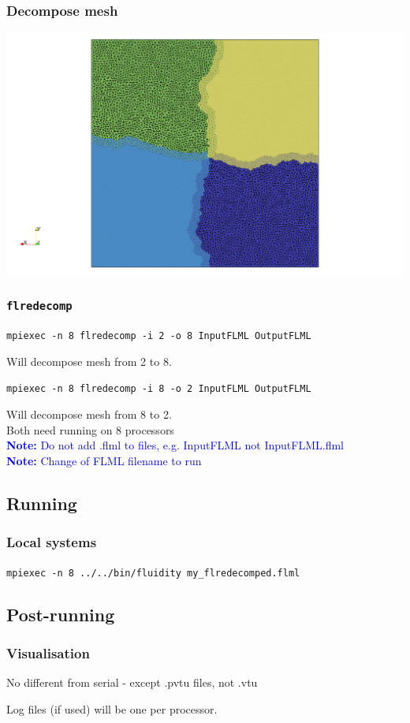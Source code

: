 \documentclass[12pt]{beamer}
\begin{document}
\begin{frame}
    \frametitle{Decompose mesh}
\vspace{-2mm}
\includegraphics[width=\textwidth]{images/domain_decomp.png}
\end{frame}

\begin{frame}
    \frametitle{\texttt{flredecomp}}
    \scriptsize{\texttt{mpiexec -n 8 flredecomp -i 2 -o 8 InputFLML OutputFLML}}
\vspace{5mm}

Will decompose mesh from 2 to 8.
\vspace{5mm}

\scriptsize{\texttt{mpiexec -n 8 flredecomp -i 8 -o 2 InputFLML OutputFLML}}
\vspace{5mm}

Will decompose mesh from 8 to 2.
\\
Both need running on 8 processors
\\
\textcolor{blue}{\textbf{Note:} Do not add .flml to files, e.g. InputFLML not InputFLML.flml}
\\
\textcolor{blue}{\textbf{Note:} Change of FLML filename to run}
\end{frame}

\subsection{Running}
\begin{frame}
    \frametitle{Local systems}

\texttt{mpiexec -n 8 ../../bin/fluidity my\_flredecomped.flml}
\end{frame}

\subsection{Post-running}
\begin{frame}
    \frametitle{Visualisation}
No different from serial - except .pvtu files, not .vtu
\vspace{5mm}

Log files (if used) will be one per processor.
\end{frame}
\end{document}
